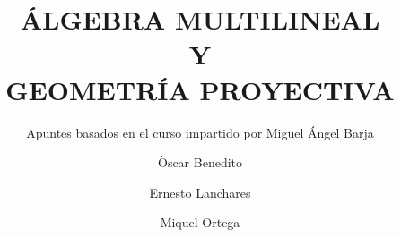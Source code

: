\documentclass[12pt,spanish]{../notes}
\title{ÁLGEBRA MULTILINEAL\\ Y\\ GEOMETRÍA PROYECTIVA}
\author{Òscar Benedito\and Ernesto Lanchares\and Miquel Ortega}
\subtitle{Apuntes basados en el curso impartido por Miguel Ángel Barja}
\begin{document}
    \frontmatter
    \maketitle
    \tableofcontents
    \mainmatter

\iffalse
\setcounter{chapter}{-1}







\printindex
\fi
\end{document}
